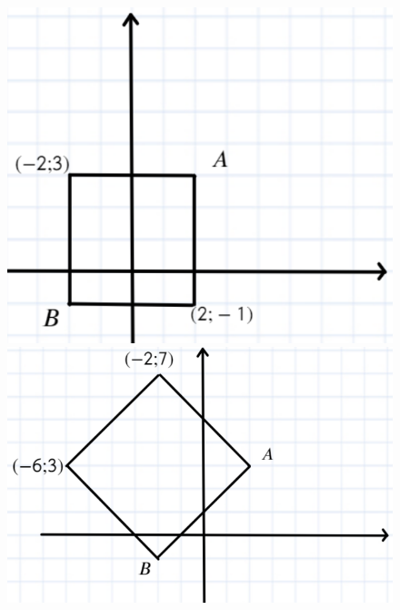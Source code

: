 \documentclass[12pt]{article}
\begin{document}
\begin{figure}[h]
\begin{center}
\begin{minipage}[h]{0.2\linewidth}
\includegraphics[width=1\linewidth]{kv1.png}
\end{minipage}
\hfill
\begin{minipage}[h]{0.4\linewidth}
\includegraphics[width=1\linewidth]{kv2.png}
\end{minipage}
\hfill
\begin{minipage}[h]{0.2\linewidth}

\end{minipage}
\end{center}
\end{figure}
\end{document}
